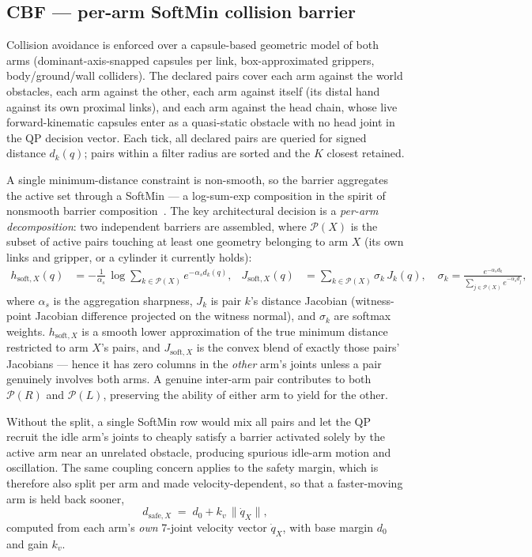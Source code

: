 \documentclass[12pt,a4paper,twoside,openright]{report}
\newcommand{\qdot}{\dot{q}}
\begin{document}
\subsection{CBF --- per-arm SoftMin collision barrier}
\label{sec:cbf}

Collision avoidance is enforced over a capsule-based geometric model of both arms (dominant-axis-snapped capsules per link, box-approximated grippers, body/ground/wall colliders). The declared pairs cover each arm against the world obstacles, each arm against the other, each arm against itself (its distal hand against its own proximal links), and each arm against the head chain, whose live forward-kinematic capsules enter as a quasi-static obstacle with no head joint in the QP decision vector. Each tick, all declared pairs are queried for signed distance $d_k(q)$; pairs within a filter radius are sorted and the $K$ closest retained.

A single minimum-distance constraint is non-smooth, so the barrier aggregates the active set through a SoftMin --- a log-sum-exp composition in the spirit of nonsmooth barrier composition~\cite{glotfelter2017}. The key architectural decision is a \emph{per-arm decomposition}: two independent barriers are assembled, where $\mathcal{P}(X)$ is the subset of active pairs touching at least one geometry belonging to arm $X$ (its own links and gripper, or a cylinder it currently holds):
\begin{align}
h_{\text{soft},X}(q) &= -\frac{1}{\alpha_s}\,\log\!\!\sum_{k \in \mathcal{P}(X)} e^{-\alpha_s d_k(q)},
&
J_{\text{soft},X}(q) &= \sum_{k \in \mathcal{P}(X)} \sigma_k\, J_k(q),
\quad
\sigma_k = \frac{e^{-\alpha_s d_k}}{\sum_{j \in \mathcal{P}(X)} e^{-\alpha_s d_j}},
\label{eq:softmin}
\end{align}
where $\alpha_s$ is the aggregation sharpness, $J_k$ is pair $k$'s distance Jacobian (witness-point Jacobian difference projected on the witness normal), and $\sigma_k$ are softmax weights. $h_{\text{soft},X}$ is a smooth lower approximation of the true minimum distance restricted to arm $X$'s pairs, and $J_{\text{soft},X}$ is the convex blend of exactly those pairs' Jacobians --- hence it has zero columns in the \emph{other} arm's joints unless a pair genuinely involves both arms. A genuine inter-arm pair contributes to both $\mathcal{P}(R)$ and $\mathcal{P}(L)$, preserving the ability of either arm to yield for the other.

Without the split, a single SoftMin row would mix all pairs and let the QP recruit the idle arm's joints to cheaply satisfy a barrier activated solely by the active arm near an unrelated obstacle, producing spurious idle-arm motion and oscillation. The same coupling concern applies to the safety margin, which is therefore also split per arm and made velocity-dependent, so that a faster-moving arm is held back sooner,
\begin{equation}
d_{\text{safe},X} \;=\; d_0 + k_v\,\|\qdot_X\|,
\label{eq:dsafe}
\end{equation}
computed from each arm's \emph{own} 7-joint velocity vector $\qdot_X$, with base margin $d_0$ and gain $k_v$.
\end{document}
